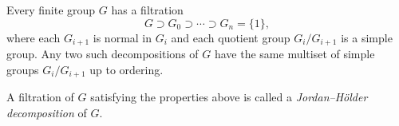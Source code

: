\documentclass[12pt]{article}
\begin{document}
Every finite group $G$ has a filtration
$$
G \supset G_0 \supset \cdots \supset G_n = \{1\},
$$
where each $G_{i+1}$ is normal in $G_i$ and each quotient group $G_i/G_{i+1}$ is a simple group. Any two such decompositions of $G$ have the same multiset of simple groups $G_i/G_{i+1}$ up to ordering.

A filtration of $G$ satisfying the properties above is called a {\em Jordan--H\"older decomposition} of $G$.
\end{document}
